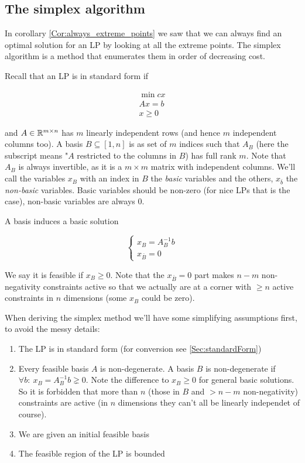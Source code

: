 \subsection{The simplex algorithm}

In corollary \ref{Cor:always_extreme_points} we saw that we can always find an optimal solution for an LP by looking at all the extreme points. The simplex algorithm is a method that enumerates them in order of decreasing cost. 

Recall that an LP is in standard form if

\begin{align*}
\min cx\\
Ax = b\\
x\geq 0
\end{align*}

and $A\in \mathbb{R}^{m\times n}$ has $m$ linearly independent rows (and hence $m$ independent columns too). A basis $B\subseteq [1,n]$ is as set of $m$ indices such that $A_B$ (here the subscript means "$A$ restricted to the columns in $B$) has full rank $m$. Note that $A_B$ is always invertible, as it is a $m\times m$ matrix with independent columns. We'll call the variables $x_B$ with an index in $B$ the \emph{basic} variables and the others, $x_{\bar b}$ the \emph{non-basic} variables. Basic variables should be non-zero (for nice LPs that is the case), non-basic variables are always 0.

A basis induces a basic solution

\[\begin{cases} x_B = A^{-1}_Bb\\ x_{\bar B} = 0\end{cases}\]

We say it is feasible if $x_B\geq 0$. Note that the $x_{\bar B}=0$ part makes $n-m$ non-negativity constraints active so that we actually are at a corner with $\geq n$ active constraints in $n$ dimensions (some $x_B$ could be zero). 

When deriving the simplex method we'll have some simplifying assumptions first, to avoid the messy details:

\begin{enumerate}
\item The LP is in standard form (for conversion see \ref{Sec:standardForm})
\item Every feasible basis $A$ is non-degenerate. A basis $B$ is non-degenerate if $\forall b:\ x_B=A^{-1}_Bb \gneq 0$. Note the difference to $x_B\geq 0$ for general basic solutions. So it is forbidden that more than $n$ (those in $B$ and $>n-m$ non-negativity) constraints are active (in $n$ dimensions they can't all be linearly independet of course). 
\item We are given an initial feasible basis
\item The feasible region of the LP is bounded
\end{enumerate}

